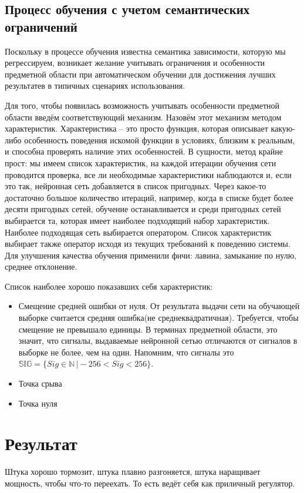 \documentclass[14pt]{extreport}
\begin{document}
            \subsection{Процесс обучения с учетом семантических ограничений}
                Поскольку в процессе обучения известна семантика зависимости, которую мы регрессируем, возникает желание учитывать ограничения и особенности предметной области при автоматическом обучении для достижения лучших результатев в типичных сценариях использования.

                Для того, чтобы появилась возможность учитывать особенности предметной области введём соответствующий механизм. Назовём этот механизм методом характеристик.
                Характеристика -- это просто функция, которая описывает какую-либо особенность поведения искомой функции в условиях, близким к реальным, и способна проверять наличие этих особенностей.
                В сущности, метод крайне прост: мы имеем список характеристик, на каждой итерации обучения сети проводится проверка, все ли необходимые характеристики наблюдаются и, если это так, нейронная сеть добавляется в список пригодных. Через какое-то достаточно большое количество итераций, например, когда в списке будет более десяти пригодных сетей, обучение останавливается и среди пригодных сетей выбирается та, которая имеет наиболее подходящий набор характеристик. Наиболее подходящая сеть выбирается оператором. Список характеристик выбирает также оператор исходя из текущих требований к поведению системы.
                Для улучшения качества обучения применили фичи: лавина, замыкание по нулю, среднее отклонение.
                
                Список наиболее хорошо показавших себя характеристик:
                    \begin{itemize}
                      \item Смещение средней ошибки от нуля. От результата выдачи сети на обучающей выборке считается средняя ошибка(не среднеквадратичная). Требуется, чтобы смещение не превышало единицы. В терминах предметной области, это значит, что сигналы, выдаваемые нейронной сетью отличаются от сигналов в выборке не более, чем на один. Напомним, что сигналы это $\mathbb{SIG} = \{Sig \in \mathbb{N}\,\vert -256 < Sig < 256\}$.
                      \item Точка срыва
                      \item Точка нуля
                    \end{itemize}
        \section{Результат}
            Штука хорошо тормозит, штука плавно разгоняется, штука наращивает мощность, чтобы что-то переехать. То есть ведёт себя как приличный регулятор.
\end{document}
